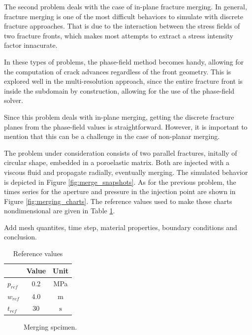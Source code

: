 The second problem deals with the case of in-plane fracture merging. In general, fracture merging is one of the most difficult behaviors to simulate with discrete fracture approaches. That is due to the interaction between the stress fields of two fracture fronts, which makes most attempts to extract a stress intensity factor innacurate. 

In these types of problems, the phase-field method becomes handy, allowing for the computation of crack advances regardless of the front geometry. This is explored well in the multi-resolution approach, since the entire fracture front is inside the subdomain by construction, allowing for the use of the phase-field solver. 

Since this problem deals with in-plane merging, getting the discrete fracture planes from the phase-field values is straightforward. However, it is important to mention that this can be a challenge in the case of non-planar merging.

The problem under consideration consists of two parallel fractures, initally of circular shape, embedded in a poroelastic matrix. Both are injected with a viscous fluid and propagate radially, eventually merging.  The simulated behavior is depicted in Figure \ref{fig:merge_snapshots}. As for the previous problem, the times series for the aperture and pressure in the injection point are shown in Figure \ref{fig:merging_charts}. The reference values used to make these charts nondimensional are given in Table \ref{merging_refs}.

Add mesh quantites, time step, material properties, boundary conditions and conclusion.

\begin{table}[ht]
  \centering
  \caption{Reference values}
  \begin{tabular}[t]{lcc}
  \hline
  &Value &Unit \\
  \hline
  $p_{ref}$&0.2&MPa\\
  $w_{ref}$&4.0&m\\
  $t_{ref}$&30&$\text{s}$\\
  \hline
  \end{tabular}
  \label{merging_refs}
\end{table}%

\begin{figure}[ht]
  \centering
  \caption{Merging spcimen.}
  \label{fig:merging_schematic}
\end{figure}


